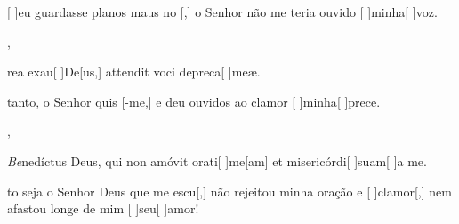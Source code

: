 {    {\item {}[ ]{eu} guardasse planos maus no [,] o Senhor não me teria ouvido [ ]{mi}{nha}[ ]{voz}.~\Antiphona},
  {\item {}rea exau[ ]{De}[us,] attendit voci depreca[ ]{me}æ.~\Antiphona}%
    {\item {}tanto, o Senhor quis [-me,] e deu ouvidos ao clamor [ ]{mi}{nha}[ ]{pre}ce.~\Antiphona},
  {\item {}\textit{Be}{ne}díctus Deus, qui non amóvit orati[ ]{me}[\-am] et misericórdi[ ]{su}{am}[ ]{a} me.~\Antiphona}%
    {\item {}to seja o Senhor Deus que me escu[,] não rejeitou minha oração e [ ]{cla}{mor}[,] nem afastou longe de mim [ ]{seu}[ ]{a}{mor}!~\Antiphona}
}
